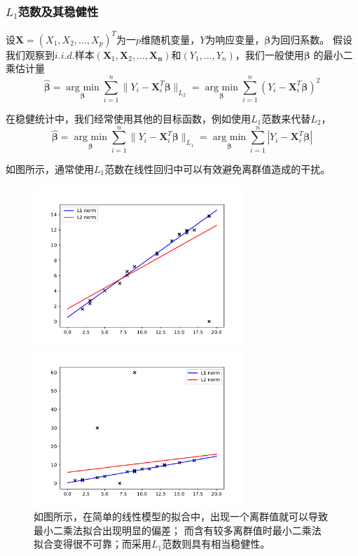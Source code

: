 \subsubsection{$L_1$范数及其稳健性}
设$\bm{X} = (X_1, X_2, ..., X_p)^T$为一$p$维随机变量，$Y$为响应变量，$\bm{\beta}$为回归系数。
假设我们观察到$i.i.d. $样本$(\bm{X}_1, \bm{X}_2, ..., \bm{X_n})$和$(Y_1, ..., Y_n)$，我们一般使用$\bm{\beta}$
的最小二乘估计量
$$\hat{\bm{\beta}} = \underset{\bm{\beta}}{\operatorname{arg\ min}} \sum_{i=1}^n\|Y_i - \bm{X}^T_i\bm{\beta}\|_{L_2}
=\underset{\bm{\beta}}{\operatorname{arg\ min}} \sum_{i=1}^n(Y_i - \bm{X}^T_i\bm{\beta})^2$$

在稳健统计中，我们经常使用其他的目标函数，例如使用$L_1$范数来代替$L_2$，
$$\hat{\bm{\beta}} = \underset{\bm{\beta}}{\operatorname{arg\ min}} \sum_{i=1}^n\|Y_i - \bm{X}^T_i\bm{\beta}\|_{L_1}
=\underset{\bm{\beta}}{\operatorname{arg\ min}} \sum_{i=1}^n|Y_i - \bm{X}^T_i\bm{\beta}|$$

如图所示，通常使用$L_1$范数在线性回归中可以有效避免离群值造成的干扰。
\begin{figure}[H]
    \centering
    \begin{minipage}[t]{0.48\textwidth}
    \includegraphics[width=8cm]{pics/l1-l2-diff2.pdf}
    \end{minipage}
    \begin{minipage}[t]{0.48\textwidth}
    \includegraphics[width=8cm]{pics/l1-l2-diff.pdf}
    \end{minipage}
    \caption{\small 如图所示，在简单的线性模型的拟合中，出现一个离群值就可以导致最小二乘法拟合出现明显的偏差；
    而含有较多离群值时最小二乘法拟合变得很不可靠；而采用$L_1$范数则具有相当稳健性。}
    \label{fig2.1}
\end{figure}

